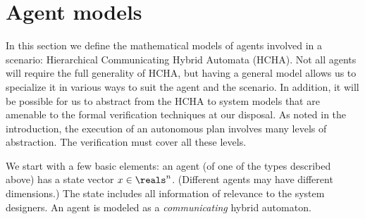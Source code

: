 \section{Agent models}
\label{HCHA}

In this section we define the mathematical models of agents involved in a scenario: Hierarchical Communicating Hybrid Automata (HCHA).
Not all agents will require the full generality of HCHA, but having a general model allows us to specialize it in various ways to suit the agent and the scenario. 
In addition, it will be possible for us to abstract from the HCHA to system models that are amenable to the formal verification techniques at our disposal. 
As noted in the introduction, the execution of an autonomous plan involves many levels of abstraction. The verification must cover all these levels.

We start with a few basic elements:
an agent (of one of the types described above) has a state vector $\stPt \in \reals^n$.
(Different agents may have different dimensions.)
The state includes all information of relevance to the system designers.%
An agent is modeled as a \emph{communicating} hybrid automaton.

